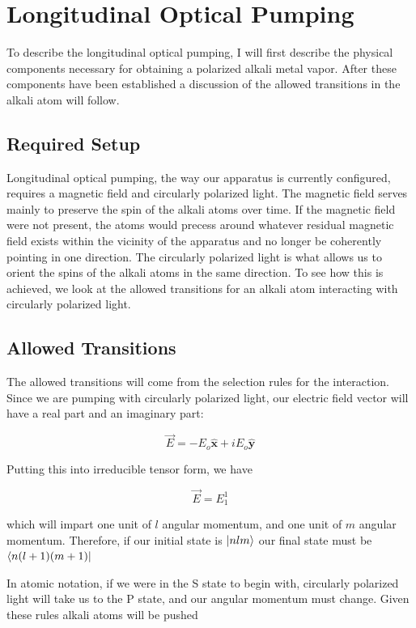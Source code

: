 \documentclass[letter,12pt]{article}
\newcommand{\xhat}{\hat{\textbf{x}}}
\newcommand{\yhat}{\hat{\textbf{y}}}
\begin{document}
\section{Longitudinal Optical Pumping}
To describe the longitudinal optical pumping, I will
first describe the physical components necessary for
obtaining a polarized alkali metal vapor. After these 
components have been established a discussion of the 
allowed transitions in the alkali atom will follow. 
	\subsection{Required Setup}
    Longitudinal optical pumping, the way our apparatus is 
    currently configured, requires a magnetic field and
    circularly polarized light. The magnetic field
	serves mainly to preserve the spin of the alkali
	atoms over time. If the magnetic field were not 
	present, the atoms would precess around whatever
	residual magnetic field exists within the vicinity
	of the apparatus and no longer be coherently pointing
	in one direction. The circularly polarized light
	is what allows us to orient the spins of the alkali
	atoms in the same direction. To see how this is
	achieved, we look at the allowed transitions for
	an alkali atom interacting with circularly polarized
	light. 

	\subsection{Allowed Transitions}
	The allowed transitions will come from the selection
	rules for the interaction. Since we are pumping with
	circularly polarized light, our electric field vector
	will have a real part and an imaginary part:
	
	\begin{equation}
		\vec{E}=-E_o \xhat  +iE_o \yhat 
	\end{equation}

	Putting this into irreducible tensor form, we have 

	\begin{equation}
		\vec{E}=E_1^1
	\end{equation}

	which will impart one unit of $l$ angular momentum,
	and one unit of $m$ angular momentum. Therefore, if
	our initial state is $\ket{nlm}$ our final state must
	be $\bra{n(l+1)(m+1)}$

	In atomic notation, if we were in the S state to begin
	with, circularly polarized light will take us to the
	P state, and our angular momentum must change. Given
	these rules alkali atoms will be pushed 
\end{document}
